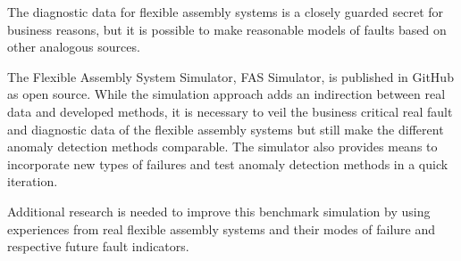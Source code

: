 \documentclass[procedia]{easychair}
\begin{document}
The diagnostic data for flexible assembly systems is a closely guarded secret for business reasons, but it is possible to make reasonable models
of faults based on other analogous sources.

The Flexible Assembly System Simulator, FAS Simulator, is published in GitHub \cite{FASSimulator} as open source. While the simulation
approach adds an indirection between real data and developed methods, it is necessary to veil the business critical real fault and diagnostic
data of the flexible assembly systems but still make the different anomaly detection methods comparable. The simulator also provides means to incorporate new types of
failures and test anomaly detection methods in a quick iteration.

Additional research is needed to improve this benchmark simulation by using experiences from real flexible assembly systems and their modes of failure
and respective future fault indicators.

\label{sect:bib}



\appendix
\end{document}
